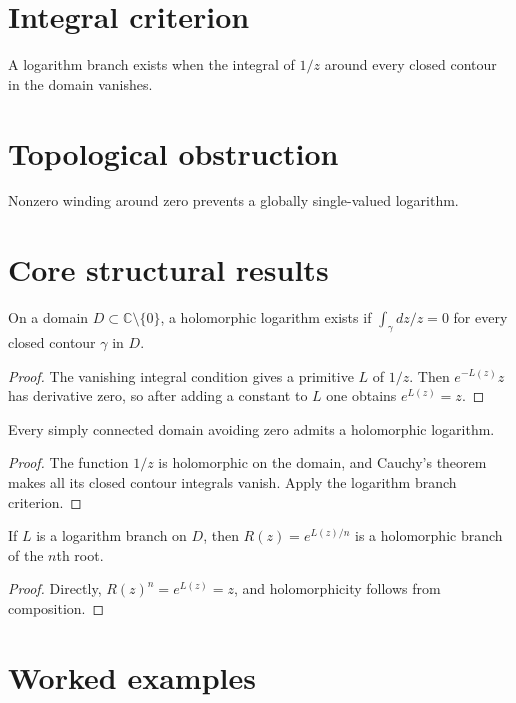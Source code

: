 \section{Integral criterion}
A logarithm branch exists when the integral of $1/z$ around every closed contour in the domain vanishes.

\section{Topological obstruction}
Nonzero winding around zero prevents a globally single-valued logarithm.

\section{Core structural results}

\begin{theorem}\label{thm:iv14-01}
On a domain $D\subset\mathbb C\setminus\{0\}$, a holomorphic logarithm exists if $\int_\gamma dz/z=0$ for every closed contour $\gamma$ in $D$.
\begin{proof}
The vanishing integral condition gives a primitive $L$ of $1/z$. Then $e^{-L(z)}z$ has derivative zero, so after adding a constant to $L$ one obtains $e^{L(z)}=z$.
\end{proof}
\end{theorem}

\begin{theorem}\label{thm:iv14-02}
Every simply connected domain avoiding zero admits a holomorphic logarithm.
\begin{proof}
The function $1/z$ is holomorphic on the domain, and Cauchy's theorem makes all its closed contour integrals vanish. Apply the logarithm branch criterion.
\end{proof}
\end{theorem}

\begin{theorem}\label{thm:iv14-03}
If $L$ is a logarithm branch on $D$, then $R(z)=e^{L(z)/n}$ is a holomorphic branch of the $n$th root.
\begin{proof}
Directly, $R(z)^n=e^{L(z)}=z$, and holomorphicity follows from composition.
\end{proof}
\end{theorem}

\section{Worked examples}

